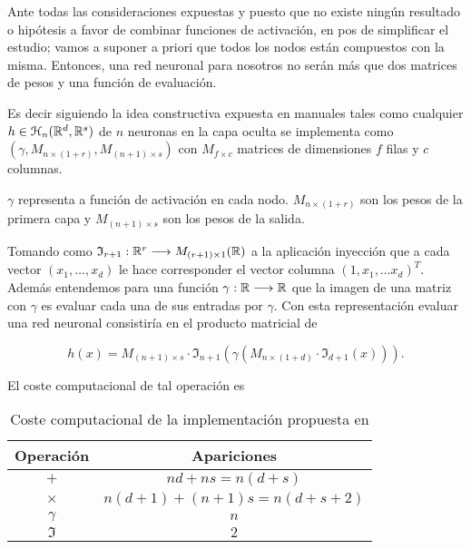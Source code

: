 Ante todas las consideraciones expuestas y puesto que 
no existe ningún resultado o hipótesis a favor de combinar funciones de activación, en pos de simplificar el estudio; vamos a suponer a priori que todos los nodos están compuestos con la misma. Entonces,  una red neuronal para nosotros 
no serán más que dos matrices de pesos y una función de evaluación. 

Es decir siguiendo la idea constructiva expuesta en manuales tales como \cite{learning-from-data-1-2}
 cualquier $h \in \mathcal{H}_n(\mathbb{R}^d,\mathbb{R}^s)$ de $n$ neuronas en la capa oculta se implementa como 
$(\gamma, M_{n \times (1+r)}, M_{(n+1) \times s})$ con $M_{f \times c}$ matrices de dimensiones $f$ filas y $c$ columnas. 

$\gamma$ representa a función de activación en cada nodo. 
$M_{n \times (1+r)}$ son los pesos de la primera capa 
y $M_{(n+1) \times s}$ son los pesos de la salida. 

Tomando como $\mathfrak{I}_{r+1}: \mathbb{R}^r \longrightarrow M_{(r+1) \times 1}(\mathbb{R})$ a la aplicación inyección que a cada vector $(x_1, \ldots, x_d)$ le hace corresponder el vector columna $(1, x_1, \ldots x_d)^T.$
Además entendemos para una función $\gamma : \mathbb{R} \longrightarrow \mathbb{R}$ 
que la imagen de una matriz con $\gamma$ es evaluar cada una de sus entradas por $\gamma$. 
Con esta representación evaluar una red neuronal consistiría en el producto matricial de 

\begin{equation}
    h(x) =  M_{(n+1) \times s} \cdot
    \mathfrak{I}_{n+1}\left(
         \gamma \left( 
             M_{n \times (1+d)} 
            \cdot 
            \mathfrak{I}_{d+1}(x)
        \right)
    \right).
\end{equation}

El coste computacional de tal operación es 
\begin{table}[H]
    \begin{center}
    \begin{tabular}{| c | c |}
    \hline
    Operación & Apariciones  \\ \hline
    $+$ & $nd+ns = n(d+s)$  \\
    $\times$ & $n(d+1)+(n+1)s = n(d+s+2)$  \\
    $\gamma$ & $n$  \\
    $\mathfrak{I}$ & $2$  \\
    \hline
    \end{tabular}
    \caption{Coste computacional de la implementación propuesta en \cite{MostafaLearningFromData}}
    \label{tab:coste computacional de la implementación de Mustafa}
    \end{center}
\end{table}

